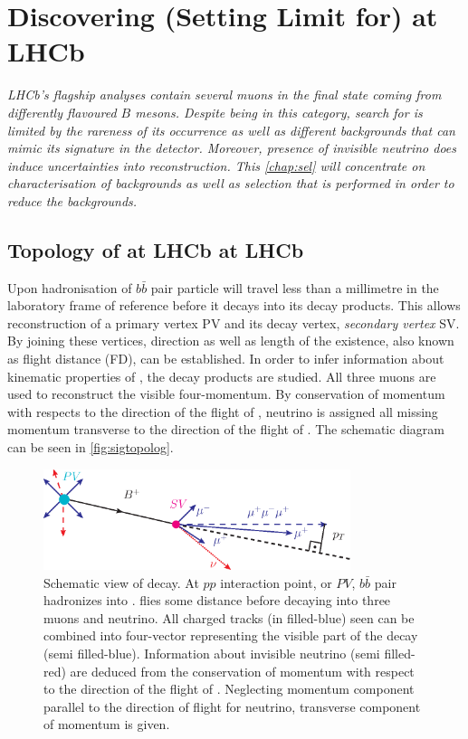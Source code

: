 \chapter{Discovering (Setting Limit for) \Bmumumu at LHCb}
\label{chap:sel}

\textit{LHCb's flagship analyses contain several muons in the final state coming from differently flavoured $B$ mesons. Despite being in this category, search for \Bmumumu is limited by the rareness of its occurrence as well as different backgrounds that can mimic its signature in the detector. Moreover, presence of invisible neutrino does induce uncertainties into reconstruction. This \autoref{chap:sel} will concentrate on characterisation of backgrounds as well as selection that is performed in order to reduce the backgrounds.}


\section{Topology of at LHCb \Bmumumu at LHCb}

Upon hadronisation of $b\bar{b}$ pair \Bpm particle will travel less than a millimetre in the laboratory frame of reference before it decays into its decay products. This allows reconstruction of a primary vertex \Gls{PV} and its decay vertex, \textit{secondary vertex} \Gls{SV}. By joining these vertices, direction as well as length of the \Bpm existence, also known as flight distance (\Gls{FD}), can be established. In order to infer information about kinematic properties of \Bpm, the decay products are studied. All three muons are used to reconstruct the visible four-momentum. By conservation of momentum with respects to the direction of the flight of \Bpm, neutrino is assigned all missing momentum transverse to the direction of the flight of \Bpm. The schematic diagram can be seen in \autoref{fig:sigtopolog}.

\begin{figure}[!h]
	\centering
	\includegraphics[width = 0.8\textwidth]{figs/sel/DecReco_fin.eps}
	\caption{Schematic view of \Bmumumu decay. At $pp$ interaction point, or $PV$, $b\bar{b}$ pair hadronizes into \Bpm. \Bpm flies some distance before decaying into three muons and neutrino. All charged tracks (in filled-blue) seen can be combined into four-vector representing the visible part of the decay (semi filled-blue). Information about invisible neutrino (semi filled-red) are deduced from the conservation of momentum with respect to the direction of the flight of \Bpm. Neglecting momentum component parallel to the direction of flight for neutrino, transverse component of momentum is given.}
	\label{fig:sigtopolog}
\end{figure}

